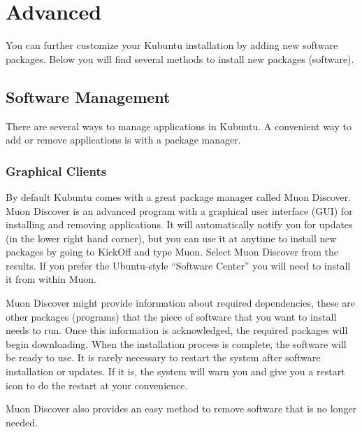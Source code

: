 \documentclass[letterpaper,10pt,english]{sphinxmanual}
\begin{document}
\noindent{}

{\hyperref[docs/basic:basic]{}}


\chapter{Advanced}
\label{docs/advanced::doc}\label{docs/advanced:advanced}\label{docs/advanced:advanced-link}
You can further customize your Kubuntu installation by adding new software packages. Below you will find several methods to install new packages (software).


\section{Software Management}
\label{docs/advanced:software-management}
There are several ways to manage applications in Kubuntu. A convenient way to add or remove applications is with a package manager.


\subsection{Graphical Clients}
\label{docs/advanced:graphical-clients}
By default Kubuntu comes with a great package manager called Muon Discover. Muon Discover is an advanced program with a graphical user interface (GUI) for installing and removing applications. It will automatically notify you for updates (in the lower right hand corner), but you can use it at anytime to install new packages by going to KickOff and type Muon. Select Muon Discover from the results. If you prefer the Ubuntu-style ``Software Center'' you will need to install it from within Muon.

\noindent{}

Muon Discover might provide information about required dependencies, these are other packages (programs) that the piece of software that you want to install needs to run. Once this information is acknowledged, the required packages will begin downloading. When the installation process is complete, the software will be ready to use. It is rarely necessary to restart the system after software installation or updates. If it is, the system will warn you and give you a restart icon to do the restart at your convenience.

Muon Discover also provides an easy method to remove software that is no longer needed.
\end{document}
